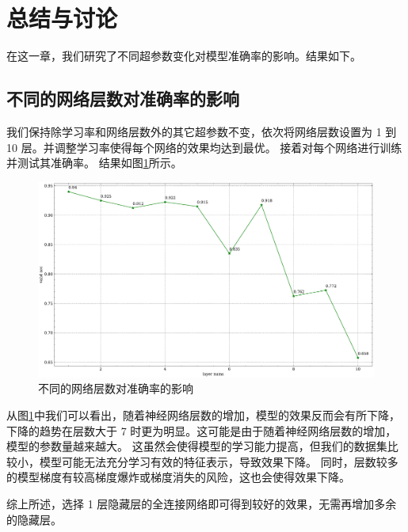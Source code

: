 \documentclass[supercite]{Experimental_Report}
\theoremstyle{definition}
\begin{document}
\section{总结与讨论}
在这一章，我们研究了不同超参数变化对模型准确率的影响。结果如下。
\subsection{不同的网络层数对准确率的影响}
我们保持除学习率和网络层数外的其它超参数不变，依次将网络层数设置为 1 到 10 层。并调整学习率使得每个网络的效果均达到最优。
接着对每个网络进行训练并测试其准确率。
结果如图\ref{不同的网络层数}所示。
\begin{figure}[H]
	\begin{center}
		\includegraphics[scale=0.35]{../images/不同的网络层数.pdf}
		\caption{不同的网络层数对准确率的影响}
		\label{不同的网络层数}
	\end{center}
\end{figure}

从图\ref{不同的网络层数}中我们可以看出，随着神经网络层数的增加，模型的效果反而会有所下降，
下降的趋势在层数大于 7 时更为明显。这可能是由于随着神经网络层数的增加，模型的参数量越来越大。
这虽然会使得模型的学习能力提高，但我们的数据集比较小，模型可能无法充分学习有效的特征表示，导致效果下降。
同时，层数较多的模型梯度有较高梯度爆炸或梯度消失的风险，这也会使得效果下降。

综上所述，选择 1 层隐藏层的全连接网络即可得到较好的效果，无需再增加多余的隐藏层。
\end{document}
